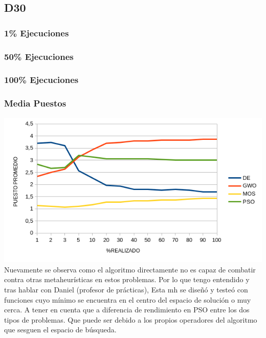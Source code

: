 \documentclass[a4paper, 12.5pt]{report}
\begin{document}
\subsection{D30}

\subsubsection*{1\% Ejecuciones}


\subsubsection*{50\% Ejecuciones}


\subsubsection*{100\% Ejecuciones}


\subsubsection*{Media Puestos}

\includegraphics*[width=1\textwidth]{Resultados/basico/d30/Grafico_puestos.png} \label{img:ranking_D30}
Nuevamente se observa como el algoritmo directamente no es capaz de combatir contra otras metaheurísticas en estos problemas. Por lo que tengo entendido y tras hablar con Daniel (profesor de prácticas), Esta mh se diseñó y testeó con funciones cuyo mínimo se encuentra en el centro del espacio de solución o muy cerca. A tener en cuenta que a diferencia de rendimiento en PSO entre los dos tipos de problemas. Que puede ser debido a los propios operadores del algoritmo que sesguen el espacio de búsqueda.
\end{document}
